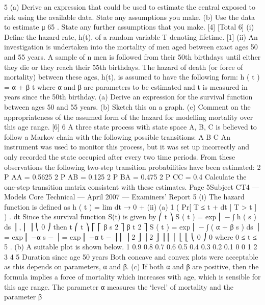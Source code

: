 \documentclass[a4paper,12pt]{article}
\begin{document}
\begin{enumerate}%
5
(a) Derive an expression that could be used to estimate the central exposed
to risk using the available data. State any assumptions you make.
(b) Use the data to estimate μ 65 . State any further assumptions that you
make.
[4]
[Total 6]
(i) Define the hazard rate, h(t), of a random variable T denoting lifetime.
[1]
(ii) An investigation is undertaken into the mortality of men aged between exact
ages 50 and 55 years. A sample of n men is followed from their 50th
birthdays until either they die or they reach their 55th birthdays.
The hazard of death (or force of mortality) between these ages, h(t), is
assumed to have the following form:
h ( t ) = α + β t
where α and β are parameters to be estimated and t is measured in years since
the 50th birthday.
(a) Derive an expression for the survival function between ages 50 and 55
years.
(b) Sketch this on a graph.
(c) Comment on the appropriateness of the assumed form of the hazard for
modelling mortality over this age range.
[6]
6
A three state process with state space {A, B, C} is believed to follow a Markov chain
with the following possible transitions:
A
B
C
An instrument was used to monitor this process, but it was set up incorrectly and only
recorded the state occupied after every two time periods. From these observations the
following two-step transition probabilities have been estimated:
2
P AA
= 0.5625
2
P AB
= 0.125
2
P BA
= 0.475
2
P CC
= 0.4
Calculate the one-step transition matrix consistent with these estimates.
Page 5Subject CT4 — Models Core Technical — April 2007 — Examiners’ Report
5
(i)
The hazard function is defined as
h ( t ) = lim
dt → 0 +
(ii)
(a)
1
( Pr[ T ≤ t + dt | T > t ] ) .
dt
Since the survival function S(t) is given by
⎛ t
⎞
S ( t ) = exp ⎜ − ∫ h ( s ) ds ⎟ ,
⎜
⎟
⎝ 0
⎠
then
t
⎛ t
⎞
⎡
⎡
β s 2 ⎤
β t 2 ⎤
S ( t ) = exp ⎜ − ∫ ( α + β s ) ds ⎟ = exp ⎢ −α s −
⎥ = exp ⎢ −α t −
⎥
⎜
⎟
2 ⎦ ⎥
2 ⎦ ⎥
⎢
⎢
⎣
⎣
⎝ 0
⎠
0
where 0 ≤ t ≤ 5 .
(b)
A suitable plot is shown below.
1
0.9
0.8
0.7
0.6
0.5
0.4
0.3
0.2
0.1
0
0
1
2
3
4
5
Duration since age 50 years
Both concave and convex plots were acceptable as this depends on
parameters, α and β.
(c)
If both α and β are positive, then the formula implies a force of
mortality which increases with age, which is sensible for this age
range.
The parameter α measures the ‘level’ of mortality and the parameter β

\end{enumerate}
\end{document}
